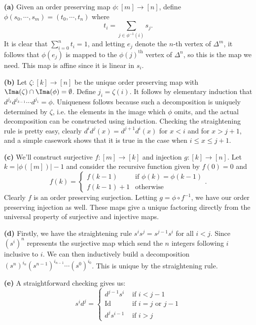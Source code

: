 \documentclass[11pt,letterpaper]{article}
\begin{document}
\begin{solution}
    \textbf{(a)} Given an order preserving map $\phi : [m] \to [n]$, define $\phi(s_0,\cdots,s_m)=(t_0,\cdots,t_n)$ where 
    \[t_i = \sum_{j\in\phi^{-1}(i)}s_j.\] 
    It is clear that $\sum^n_{i=0}t_i=1$, and letting $e_j$ denote the $n$-th vertex of $\Delta^m$, it follows that $\phi(e_j)$ is mapped to the $\phi(j)^\text{th}$ vertex of $\Delta^n$, so this is the map we need. This map is affine since it is linear in $s_i$.
    
    \textbf{(b)} Let $\zeta : [k] \to [n]$ be the unique order preserving map with $\Ima(\zeta)\cap \Ima(\phi)=\emptyset$. Define $j_i = \zeta(i)$. It follows by elementary induction that $d^{j_k}d^{j_{k-1}}\cdots d^{j_1}=\phi$. Uniqueness follows because such a decomposition is uniquely determined by $\zeta$, i.e. the elements in the image which $\phi$ omits, and the actual decomposition can be constructed using induction. Checking the straightening rule is pretty easy, clearly $d^id^j(x)=d^{j+1}d^i(x)$ for $x<i$ and for $x>j+1$, and a simple casework shows that it is true in the case when $i\leq x\leq j+1$. 
    
    \textbf{(c)} We'll construct surjective $f : [m] \to [k]$ and injection $g : [k] \to [n]$. Let $k = |\phi([m])|-1$ and consider the recursive function given by $f(0)=0$ and 
    \[
        f(k)=\begin{cases}
            f(k-1)&\textrm{if }\phi(k) = \phi(k-1)\\
            f(k-1)+1 &\textrm{otherwise}
        \end{cases}
    .\]
    Clearly $f$ is an order preserving surjection. Letting $g = \phi \circ f^{-1}$, we have our order preserving injection as well. These maps give a unique factoring directly from the universal property of surjective and injective maps.
    
    \textbf{(d)} Firstly, we have the straightening rule $s^is^j=s^{j-1}s^i$ for all $i<j$. Since $(s^i)^n$ represents the surjective map which send the $n$ integers following $i$ inclusive to $i$. We can then inductively build a decomposition $(s^n)^{i_n}(s^{n-1})^{i_{n-1}}\cdots (s^0)^{i_0}$. This is unique by the straightening rule.
    
    \textbf{(e)} A straightforward checking gives us:
    \[s^id^j = \begin{cases}d^{j-1}s^i & \text{ if } i<j-1\\ \text{Id} & \text{ if } i=j \text{ or } j-1\\ d^js^{i-1} & \text{ if } i > j \end{cases}\]
        

\end{solution}
\end{document}
